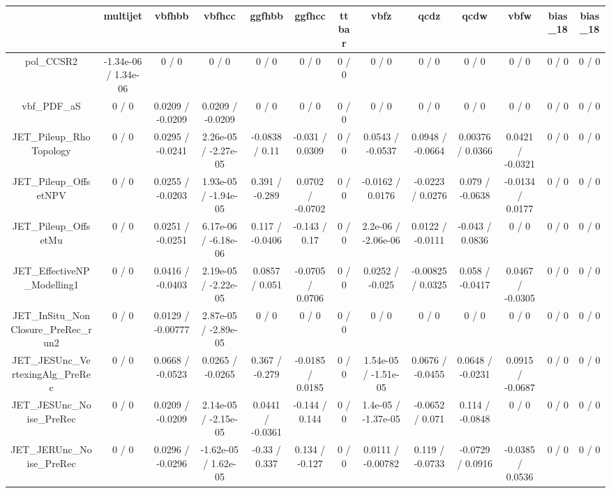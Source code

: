 \documentclass[10pt]{article}
\begin{document}
\begin{table}[htbp]
\begin{center}
\begin{tabular}{|c|c|c|c|c|c|c|c|c|c|c|c|c|}
\hline 
      & multijet      & vbfhbb      & vbfhcc      & ggfhbb      & ggfhcc      & ttbar      & vbfz      & qcdz      & qcdw      & vbfw      & bias_18      & bias_18 \\ 
\hline 
  pol_CCSR2 & -1.34e-06 / 1.34e-06 & 0 / 0 & 0 / 0 & 0 / 0 & 0 / 0 & 0 / 0 & 0 / 0 & 0 / 0 & 0 / 0 & 0 / 0 & 0 / 0 & 0 / 0 \\ 
  vbf_PDF_aS & 0 / 0 & 0.0209 / -0.0209 & 0.0209 / -0.0209 & 0 / 0 & 0 / 0 & 0 / 0 & 0 / 0 & 0 / 0 & 0 / 0 & 0 / 0 & 0 / 0 & 0 / 0 \\ 
  JET_Pileup_RhoTopology & 0 / 0 & 0.0295 / -0.0241 & 2.26e-05 / -2.27e-05 & -0.0838 / 0.11 & -0.031 / 0.0309 & 0 / 0 & 0.0543 / -0.0537 & 0.0948 / -0.0664 & 0.00376 / 0.0366 & 0.0421 / -0.0321 & 0 / 0 & 0 / 0 \\ 
  JET_Pileup_OffsetNPV & 0 / 0 & 0.0255 / -0.0203 & 1.93e-05 / -1.94e-05 & 0.391 / -0.289 & 0.0702 / -0.0702 & 0 / 0 & -0.0162 / 0.0176 & -0.0223 / 0.0276 & 0.079 / -0.0638 & -0.0134 / 0.0177 & 0 / 0 & 0 / 0 \\ 
  JET_Pileup_OffsetMu & 0 / 0 & 0.0251 / -0.0251 & 6.17e-06 / -6.18e-06 & 0.117 / -0.0406 & -0.143 / 0.17 & 0 / 0 & 2.2e-06 / -2.06e-06 & 0.0122 / -0.0111 & -0.043 / 0.0836 & 0 / 0 & 0 / 0 & 0 / 0 \\ 
  JET_EffectiveNP_Modelling1 & 0 / 0 & 0.0416 / -0.0403 & 2.19e-05 / -2.22e-05 & 0.0857 / 0.051 & -0.0705 / 0.0706 & 0 / 0 & 0.0252 / -0.025 & -0.00825 / 0.0325 & 0.058 / -0.0417 & 0.0467 / -0.0305 & 0 / 0 & 0 / 0 \\ 
  JET_InSitu_NonClosure_PreRec_run2 & 0 / 0 & 0.0129 / -0.00777 & 2.87e-05 / -2.89e-05 & 0 / 0 & 0 / 0 & 0 / 0 & 0 / 0 & 0 / 0 & 0 / 0 & 0 / 0 & 0 / 0 & 0 / 0 \\ 
  JET_JESUnc_VertexingAlg_PreRec & 0 / 0 & 0.0668 / -0.0523 & 0.0265 / -0.0265 & 0.367 / -0.279 & -0.0185 / 0.0185 & 0 / 0 & 1.54e-05 / -1.51e-05 & 0.0676 / -0.0455 & 0.0648 / -0.0231 & 0.0915 / -0.0687 & 0 / 0 & 0 / 0 \\ 
  JET_JESUnc_Noise_PreRec & 0 / 0 & 0.0209 / -0.0209 & 2.14e-05 / -2.15e-05 & 0.0441 / -0.0361 & -0.144 / 0.144 & 0 / 0 & 1.4e-05 / -1.37e-05 & -0.0652 / 0.071 & 0.114 / -0.0848 & 0 / 0 & 0 / 0 & 0 / 0 \\ 
  JET_JERUnc_Noise_PreRec & 0 / 0 & 0.0296 / -0.0296 & -1.62e-05 / 1.62e-05 & -0.33 / 0.337 & 0.134 / -0.127 & 0 / 0 & 0.0111 / -0.00782 & 0.119 / -0.0733 & -0.0729 / 0.0916 & -0.0385 / 0.0536 & 0 / 0 & 0 / 0 \\ 

\end{tabular}
\end{center}
\end{table}
\end{document}
